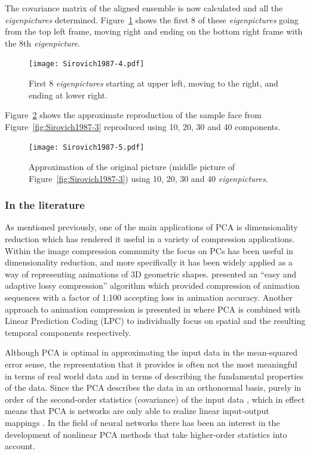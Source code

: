 The covariance matrix of the aligned ensemble is now calculated and all the \emph{eigenpictures} determined. Figure~\ref{fig:Sirovich1987-4} shows the first 8 of these \emph{eigenpictures} going from the top left frame, moving right and ending on the bottom right frame with the 8th \emph{eigenpicture}.

\begin{figure}[!]
  \begin{center}
    \texttt{[image: Sirovich1987-4.pdf]}
    \caption{First 8 \emph{eigenpictures} starting at upper left, moving to the right, and ending at lower right.}\label{fig:Sirovich1987-4}
  \end{center}
\end{figure}

Figure~\ref{fig:Sirovich1987-5} shows the approximate reproduction of the sample face from Figure~\ref{fig:Sirovich1987-3} reproduced using 10, 20, 30 and 40 components.

\begin{figure}[!]
  \begin{center}
    \texttt{[image: Sirovich1987-5.pdf]}
    \caption{Approximation of the original picture (middle picture of Figure~\ref{fig:Sirovich1987-3}) using 10, 20, 30 and 40 \emph{eigenpictures}.}\label{fig:Sirovich1987-5}
  \end{center}
\end{figure}



\subsubsection{In the literature}
As mentioned previously, one of the main applications of PCA is dimensionality reduction which has rendered it useful in a variety of compression applications. Within the image compression community \citep{Vasilescu2003} the focus on PCs has been useful in dimensionality reduction, and more specifically it has been widely applied as a way of representing animations of 3D geometric shapes. \cite{Alexa2000} presented an ``easy and adaptive lossy compression'' algorithm which provided compression of animation sequences with a factor of 1:100 accepting loss in animation accuracy. Another approach to animation compression is presented in \cite{Karni2004} where PCA is combined with Linear Prediction Coding (LPC) to individually focus on spatial and the resulting temporal components respectively.

Although PCA is optimal in approximating the input data in the mean-squared error sense, the representation that it provides is often not the most meaningful in terms of real world data and in terms of describing the fundamental properties of the data. Since the PCA describes the data in an orthonormal basis, purely in order of the second-order statistics (covariance) of the input data \citep{Oja1995}, which in effect means that PCA is networks are only able to realize linear input-output mappings \citep{Karhunen1995}. In the field of neural networks there has been an interest in the development of nonlinear PCA methods that take higher-order statistics into account.

